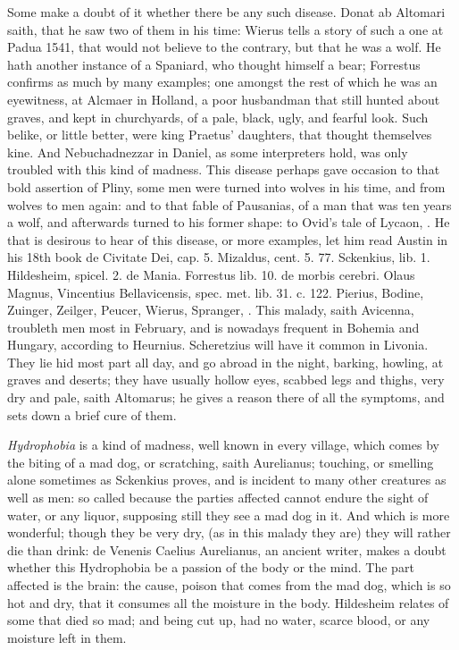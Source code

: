 {Some make a doubt of it whether there be any such disease. Donat
ab Altomari saith, that he saw two of them in his time: Wierus
tells a story of such a one at Padua 1541, that would not believe to
the contrary, but that he was a wolf. He hath another instance of a
Spaniard, who thought himself a bear; Forrestus confirms as much
by many examples; one amongst the rest of which he was an eyewitness,
at Alcmaer in Holland, a poor husbandman that still hunted about
graves, and kept in churchyards, of a pale, black, ugly, and fearful
look. Such belike, or little better, were king Praetus' daughters,
that thought themselves kine. And Nebuchadnezzar in Daniel, as some
interpreters hold, was only troubled with this kind of madness. This
disease perhaps gave occasion to that bold assertion of Pliny,
some men were turned into wolves in his time, and from wolves to men
again: and to that fable of Pausanias, of a man that was ten years a
wolf, and afterwards turned to his former shape: to Ovid's tale of
Lycaon, \etc{}. He that is desirous to hear of this disease, or more
examples, let him read Austin in his 18th book de Civitate Dei, cap. 5.
Mizaldus, cent. 5. 77. Sckenkius, lib. 1. Hildesheim, spicel. 2. de
Mania. Forrestus lib. 10. de morbis cerebri. Olaus Magnus, Vincentius
Bellavicensis, spec. met. lib. 31. c. 122. Pierius, Bodine, Zuinger,
Zeilger, Peucer, Wierus, Spranger, \etc{}. This malady, saith Avicenna,
troubleth men most in February, and is nowadays frequent in Bohemia and
Hungary, according to Heurnius. Scheretzius will have it common in
Livonia. They lie hid most part all day, and go abroad in the night,
barking, howling, at graves and deserts; they have usually hollow
eyes, scabbed legs and thighs, very dry and pale, saith Altomarus;
he gives a reason there of all the symptoms, and sets down a brief cure
of them.

\emph{Hydrophobia} is a kind of madness, well known in every village, which
comes by the biting of a mad dog, or scratching, saith Aurelianus;
touching, or smelling alone sometimes as Sckenkius proves, and is
incident to many other creatures as well as men: so called because the
parties affected cannot endure the sight of water, or any liquor,
supposing still they see a mad dog in it. And which is more wonderful;
though they be very dry, (as in this malady they are) they will rather
die than drink: de Venenis Caelius Aurelianus, an ancient writer,
makes a doubt whether this Hydrophobia be a passion of the body or the
mind. The part affected is the brain: the cause, poison that comes from
the mad dog, which is so hot and dry, that it consumes all the moisture
in the body.  Hildesheim relates of some that died so mad; and
being cut up, had no water, scarce blood, or any moisture left in them.

}
